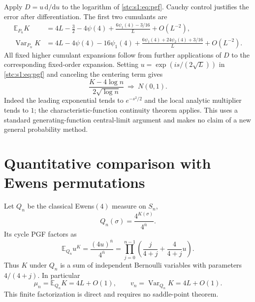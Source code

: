 \documentclass[11pt,letterpaper]{article}
\numberwithin{equation}{section}
\theoremstyle{remark}\newtheorem{remark}[theorem]{Remark}
\newcommand{\E}{\mathbb E}
\newcommand{\rf}[2]{#1^{\overline{#2}}}
\DeclareMathOperator{\Var}{Var}
\begin{document}
Apply $D=u\,\mathrm d/\mathrm du$ to the logarithm of \eqref{stc:s1:eq:pgf}. Cauchy control justifies the error after differentiation. The first two cumulants are
\begin{align}\label{stc:s1:eq:mean}
 \E_{P_n}K&=4L-\frac32-4\psi(4)
       +\frac{6\psi_1(4)-3/16}{L}+O(L^{-2}),\\
 \Var_{P_n}K&=4L-4\psi(4)-16\psi_1(4)
       +\frac{6\psi_1(4)+24\psi_2(4)+3/16}{L}+O(L^{-2}).\label{stc:s1:eq:variance}
\end{align}
All fixed higher cumulant expansions follow from further applications of $D$ to the corresponding fixed-order expansion. Setting $u=\exp(is/(2\sqrt L))$ in \eqref{stc:s1:eq:pgf} and canceling the centering term gives
\begin{equation}\label{stc:s1:eq:clt}
 \frac{K-4\log n}{2\sqrt{\log n}}\ \Longrightarrow\ N(0,1).
\end{equation}
Indeed the leading exponential tends to $e^{-s^2/2}$ and the local analytic multiplier tends to $1$; the characteristic-function continuity theorem applies. This uses a standard generating-function central-limit argument and makes no claim of a new general probability method.

\section{Quantitative comparison with Ewens permutations}\label{stc:s1:sec:ewens}
Let $Q_n$ be the classical Ewens$(4)$ measure on $S_n$,
\begin{equation}\label{stc:s1:eq:Q}
 Q_n(\sigma)=\frac{4^{K(\sigma)}}{\rf4n}.
\end{equation}
Its cycle PGF factors as
\[
 \E_{Q_n}u^K=\frac{\rf{(4u)}{n}}{\rf4n}
   =\prod_{j=0}^{n-1}\left(\frac{j}{4+j}+\frac4{4+j}u\right).
\]
Thus $K$ under $Q_n$ is a sum of independent Bernoulli variables with parameters $4/(4+j)$. In particular
\begin{equation}\label{stc:s1:eq:Qmom}
 \mu_n=\E_{Q_n}K=4L+O(1),\qquad
 v_n=\Var_{Q_n}K=4L+O(1).
\end{equation}
This finite factorization is direct and requires no saddle-point theorem.
\end{document}
